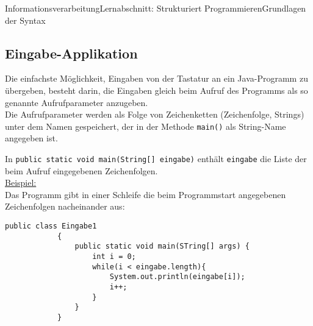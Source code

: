 \documentclass[11pt,oneside,openany,headings=optiontotoc,11pt,numbers=noenddot]{article}
\begin{document}
\begin{worksheet}{Informationsverarbeitung}{Lernabschnitt: Strukturiert Programmieren}{Grundlagen der Syntax}
		\subsection{Eingabe-Applikation}
		Die einfachste Möglichkeit, Eingaben von der Tastatur an ein Java-Programm zu übergeben, besteht darin, die Eingaben gleich beim Aufruf des Programms als so genannte Aufrufparameter anzugeben.\\
		Die Aufrufparameter werden als Folge von Zeichenketten (Zeichenfolge, Strings) unter dem Namen gespeichert, der in der Methode \lstinline[style=Python]|main()| als String-Name angegeben ist.\\
		\par\noindent
		In \lstinline[style=Python]|public static void main(String[] eingabe)| enthält \lstinline[style=Python]|eingabe| die Liste der beim Aufruf eingegebenen Zeichenfolgen.\\
		\underline{Beispiel:}\\
		Das Programm gibt in einer Schleife die beim Programmstart angegebenen Zeichenfolgen nacheinander aus:
		\begin{lstlisting}[style=Python]
			public class Eingabe1
			{
				public static void main(STring[] args) {
					int i = 0;
					while(i < eingabe.length){
						System.out.println(eingabe[i]);
						i++;
					}
				}
			}
		\end{lstlisting}
		

\end{worksheet}
\end{document}
